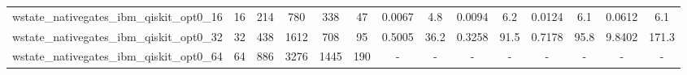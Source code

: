 \begin{table}[htb]
{\begin{tabular}{|c|c|c|c|c|c|c|c|c|c|c|c|c|c|}
wstate\_nativegates\_ibm\_qiskit\_opt0\_16 & 16 & 214 & 780 & 338 & 47 & 0.0067 & 4.8 & 0.0094 & 6.2 & 0.0124 & 6.1 & 0.0612 & 6.1 \\ 
wstate\_nativegates\_ibm\_qiskit\_opt0\_32 & 32 & 438 & 1612 & 708 & 95 & 0.5005 & 36.2 & 0.3258 & 91.5 & 0.7178 & 95.8 & 9.8402 & 171.3 \\ 
wstate\_nativegates\_ibm\_qiskit\_opt0\_64 & 64 & 886 & 3276 & 1445 & 190 & - & - & - & - & - & - & - & - \\ 
\hline 
\end{tabular}} 
\end{table} 
